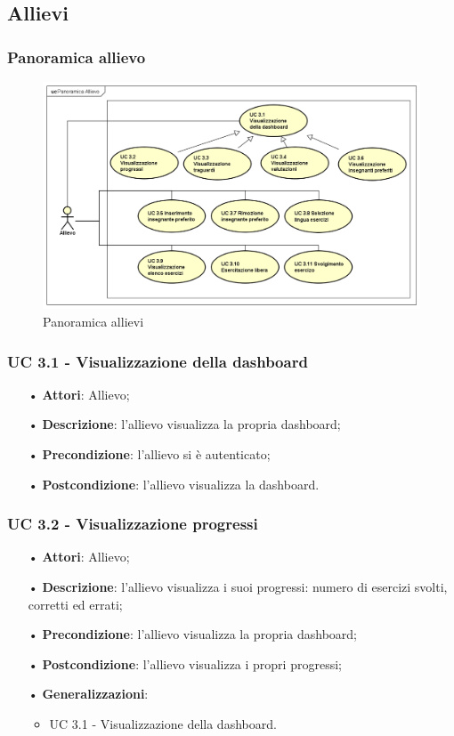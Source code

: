 \subsection{Allievi}
\subsubsection{Panoramica allievo}

\begin{figure}[H]
\centering
\includegraphics[width=17cm]{img/PanoramicaAllievi.png} 
\caption{Panoramica allievi}\label{fig:31}
\end{figure}


\subsubsection{UC 3.1 - Visualizzazione della dashboard}
\begin{itemize}
\item[•]\textbf{Attori}: Allievo;
\item[•]\textbf{Descrizione}: l'allievo visualizza la propria dashboard;
\item[•]\textbf{Precondizione}: l'allievo si è autenticato;
\item[•]\textbf{Postcondizione}: l'allievo visualizza la dashboard.
\end{itemize}

\subsubsection{UC 3.2 - Visualizzazione progressi}
\begin{itemize}
\item[•]\textbf{Attori}: Allievo;
\item[•]\textbf{Descrizione}: l'allievo visualizza i suoi progressi: numero di esercizi svolti, corretti ed errati;
\item[•]\textbf{Precondizione}: l'allievo visualizza la propria dashboard;
\item[•]\textbf{Postcondizione}: l'allievo visualizza i propri progressi;
\item[•]\textbf{Generalizzazioni}:
\begin{itemize}
\item UC 3.1 - Visualizzazione della dashboard.
\end{itemize}
\end{itemize}
